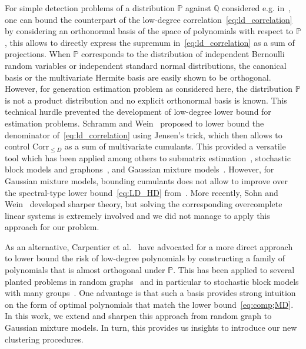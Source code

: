 \documentclass{article}
\begin{document}
For simple detection problems of a distribution $\mathbb{P}$ against $\mathbb{Q}$ considered e.g. in~\cite{HopkinsFOCS17,KuniskyWeinBandeira}, one can bound the counterpart of the low-degree correlation~\eqref{eq:ld_correlation} by considering an orthonormal basis of the space of polynomials with respect to $\mathbb{P}$, this allows to directly express the supremum in~\eqref{eq:ld_correlation} as a sum of projections.  When $\mathbb{P}$ corresponds to the distribution of independent Bernoulli random variables or independent standard normal distributions, the canonical basis or the multivariate Hermite basis are easily shown to be orthogonal. However, for generation estimation problem as considered here, the distribution $\mathbb{P}$ is not a product distribution and no explicit orthonormal basis is known. This technical hurdle prevented the development of low-degree lower bound for estimation problems. Schramm and Wein~\cite{SchrammWein22} proposed to lower bound the denominator of~\eqref{eq:ld_correlation} using Jensen's trick, which then allows to control $\mathrm{Corr}_{\leq D}$ as a sum of multivariate cumulants.
This provided a versatile tool which has been applied among others to submatrix estimation~\cite{SchrammWein22}, stochastic block models and graphons~\cite{luo2023computational}, and Gaussian mixture models~\cite{Even25}. However, for Gaussian mixture models, bounding cumulants does not allow to improve over the spectral-type lower bound~\eqref{eq:LD_HD} from~\cite{Even25}. More recently, Sohn and Wein~\cite{SohnWein25} developed  sharper theory, but solving the corresponding overcomplete linear systems is extremely involved and we did not manage to apply this approach for our problem. 

As an alternative, Carpentier et al.~\cite{CGGV25} have advocated for a more direct approach to lower bound the risk of low-degree polynomials by constructing a family of polynomials that is almost orthogonal under $\mathbb{P}$. This has been applied to several planted problems in random graphs~\cite{CGGV25} and in particular to stochastic block models with many groups~\cite{carpentier2025phase}. One advantage is that such a basis  provides strong  intuition on the form of optimal polynomials that match the lower bound~\eqref{eq:comp;MD}. In this work, we extend and sharpen this approach  from random graph to Gaussian mixture models. In turn, this provides us insights to introduce our new clustering procedures.
\end{document}
